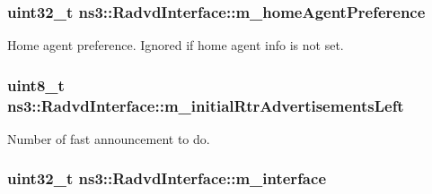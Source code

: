 \subsubsection[{\texorpdfstring{m\+\_\+home\+Agent\+Preference}{m_homeAgentPreference}}]{\setlength{\rightskip}{0pt plus 5cm}uint32\+\_\+t ns3\+::\+Radvd\+Interface\+::m\+\_\+home\+Agent\+Preference\hspace{0.3cm}{\ttfamily [private]}}\hypertarget{classns3_1_1RadvdInterface_ae2318bfaab9b5540ed402716a157ceec}{}\label{classns3_1_1RadvdInterface_ae2318bfaab9b5540ed402716a157ceec}


Home agent preference. Ignored if home agent info is not set. 

\subsubsection[{\texorpdfstring{m\+\_\+initial\+Rtr\+Advertisements\+Left}{m_initialRtrAdvertisementsLeft}}]{\setlength{\rightskip}{0pt plus 5cm}uint8\+\_\+t ns3\+::\+Radvd\+Interface\+::m\+\_\+initial\+Rtr\+Advertisements\+Left\hspace{0.3cm}{\ttfamily [private]}}\hypertarget{classns3_1_1RadvdInterface_a0a1a025101e4b511c07e344901238286}{}\label{classns3_1_1RadvdInterface_a0a1a025101e4b511c07e344901238286}


Number of fast announcement to do. 

\subsubsection[{\texorpdfstring{m\+\_\+interface}{m_interface}}]{\setlength{\rightskip}{0pt plus 5cm}uint32\+\_\+t ns3\+::\+Radvd\+Interface\+::m\+\_\+interface\hspace{0.3cm}{\ttfamily [private]}}\hypertarget{classns3_1_1RadvdInterface_abbff31a8371255eb386544f23a1838b2}{}\label{classns3_1_1RadvdInterface_abbff31a8371255eb386544f23a1838b2}


